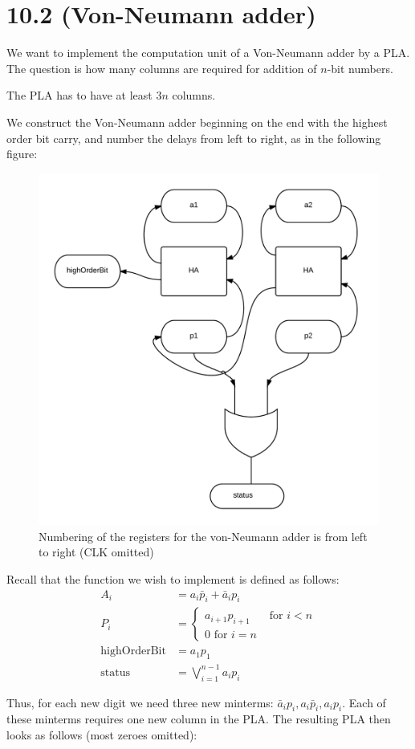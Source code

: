 \documentclass[10pt,a4paper]{scrartcl}
\begin{document}
\FloatBarrier

\section*{10.2 (Von-Neumann adder)}
We want to implement the computation unit of a Von-Neumann adder by a PLA. 
The question is how many columns are required for addition of $n$-bit numbers.

 The PLA has to have at least $3n$ columns.

We construct the Von-Neumann adder beginning on the end with the highest order bit carry,
and number the delays from left to right, as in the following figure:
\begin{figure}[H]
  \centering\includegraphics[width=0.6\linewidth]{images/vonNeumannAdder.png}
  \caption{Numbering of the registers for the von-Neumann adder is from left to right (CLK omitted)}
\end{figure}

Recall that the function we wish to implement is defined as follows:
\begin{align*}
  A_i &= a_i \bar p_i + \bar a_i p_i \\
  P_i &= \left\{\begin{array}{ll} a_{i+1}p_{i+1} & \textrm{ for } i<n \\ 0 \textrm{ for } i = n \end{array}\right. \\
  \mathrm{highOrderBit} &= a_1 p_1 \\
  \mathrm{status} &= \bigvee_{i=1}^{n-1} a_i p_i
\end{align*}

Thus, for each new digit we need three new minterms: $\bar a_i p_i, a_i\bar p_i, a_i p_i$.
Each of these minterms requires one new column in the PLA. 
The resulting PLA then looks as follows (most zeroes omitted):
\end{document}
